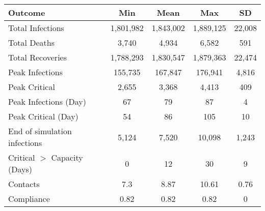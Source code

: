 \begin{table}[ht]
\centering
\begin{tabular}{lcccc}
  \hline
Outcome & Min & Mean & Max & SD \\ 
  \hline
Total Infections & 1,801,982 & 1,843,002 & 1,889,125 & 22,008 \\ 
  Total Deaths &     3,740 &     4,934 &     6,582 &    591 \\ 
  Total Recoveries & 1,788,293 & 1,830,547 & 1,879,363 & 22,474 \\ 
  Peak Infections &   155,735 &   167,847 &   176,941 &  4,816 \\ 
  Peak Critical &     2,655 &     3,368 &     4,413 &    409 \\ 
  Peak Infections (Day) & 67 & 79 & 87 & 4 \\ 
  Peak Critical (Day) & 54 & 86 & 105 & 10 \\ 
  End of simulation infections & 5,124 & 7,520 & 10,098 & 1,243 \\ 
  Critical $>$ Capacity (Days) & 0 & 12 & 30 & 9 \\ 
  Contacts & 7.3 & 8.87 & 10.61 & 0.76 \\ 
  Compliance & 0.82 & 0.82 & 0.82 & 0 \\ 
   \hline
\end{tabular}
\end{table}
